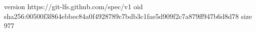 version https://git-lfs.github.com/spec/v1
oid sha256:00500f3f864ebbec84a0f4928789c7bdb3c1fae5d909f2c7a879ff947b6d8d78
size 977
